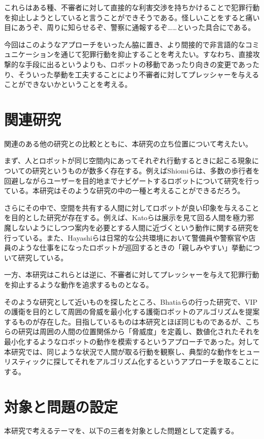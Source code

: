 \documentclass{kuisthesis}
\begin{document}
これらはある種、不審者に対して直接的な利害交渉を持ちかけることで犯罪行動を抑止しようとしていると言うことができそうである。怪しいことをすると痛い目にあうぞ、周りに知らせるぞ、警察に通報するぞ……といった具合にである。

今回はこのようなアプローチをいったん脇に置き、より間接的で非言語的なコミュニケーションを通じて犯罪行動を抑止することを考えたい。すなわち、直接攻撃的な手段に出るというよりも、ロボットの移動であったり向きの変更であったり、そういった挙動を工夫することにより不審者に対してプレッシャーを与えることができないかということを考える。


\section{関連研究}
関連のある他の研究との比較とともに、本研究の立ち位置について考えたい。

まず、人とロボットが同じ空間内にあってそれぞれ行動するときに起こる現象についての研究というものが数多く存在する。例えばShiomiらは、多数の歩行者を回避しながらユーザーを目的地までナビゲートするロボットについて研究を行っている\cite{1}。本研究はそのような研究の中の一種と考えることができるだろう。

さらにその中で、空間を共有する人間に対してロボットが良い印象を与えることを目的とした研究が存在する。例えば、Katoらは展示を見て回る人間を極力邪魔しないようにしつつ案内を必要とする人間に近づくという動作に関する研究\cite{2}を行っている。また、Hayashiらは日常的な公共環境において警備員や警察官や店員のような仕事をになったロボットが巡回するときの「親しみやすい」挙動について研究している\cite{3}。

一方、本研究はこれらとは逆に、不審者に対してプレッシャーを与えて犯罪行動を抑止するような動作を追求するものとなる。

そのような研究として近いものを探したところ、Bhatiaらの行った研究で、VIPの護衛を目的として周囲の脅威を最小化する護衛ロボットのアルゴリズムを提案するもの\cite{4}が存在した。目指しているものは本研究とほぼ同じものであるが、こちらの研究は周囲の人間の位置関係から「脅威度」を定義し、数値化されたそれを最小化するようなロボットの動作を模索するというアプローチであった。対して本研究では、同じような状況で人間が取る行動を観察し、典型的な動作をヒューリスティックに探してそれをアルゴリズム化するというアプローチを取ることにする。

\section{対象と問題の設定}
本研究で考えるテーマを、以下の三者を対象とした問題として定義する。
\end{document}
